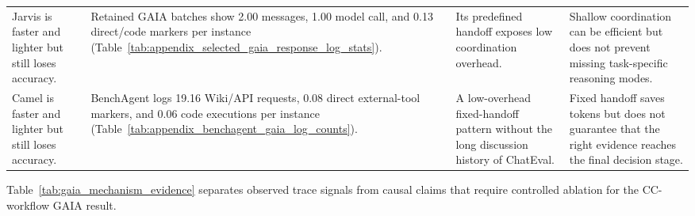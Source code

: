 \begin{table}[t]
\begin{tabular}{p{}p{}p{}p{}}
Jarvis is faster and lighter but still loses accuracy. & Retained GAIA batches show 2.00 messages, 1.00 model call, and 0.13 direct/code markers per instance (Table~\ref{tab:appendix_selected_gaia_response_log_stats}). & Its predefined handoff exposes low coordination overhead. & Shallow coordination can be efficient but does not prevent missing task-specific reasoning modes. \\
Camel is faster and lighter but still loses accuracy. & BenchAgent logs 19.16 Wiki/API requests, 0.08 direct external-tool markers, and 0.06 code executions per instance (Table~\ref{tab:appendix_benchagent_gaia_log_counts}). & A low-overhead fixed-handoff pattern without the long discussion history of ChatEval. & Fixed handoff saves tokens but does not guarantee that the right evidence reaches the final decision stage. \\
\bottomrule
\end{tabular}
\renewcommand{\arraystretch}{1.0}
\end{table}

Table~\ref{tab:gaia_mechanism_evidence} separates observed trace signals from causal claims that require controlled ablation for the CC-workflow GAIA result.

